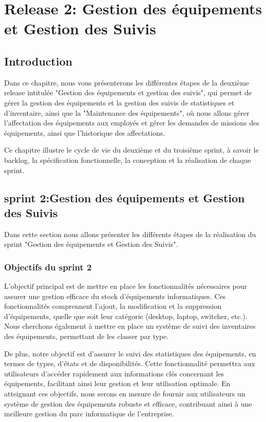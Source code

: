 ﻿\chapter{Release 2: Gestion des équipements et Gestion des Suivis}





\section*{Introduction}
Dans ce chapitre, nous vous présenterons les différentes étapes de la deuxième release intitulée "Gestion des équipements et gestion des suivis", qui permet de gérer la gestion des équipements et la gestion des suivis de statistiques et d'inventaire, ainsi que la "Maintenance des équipements", où nous allons gérer l'affectation des équipements aux employés et gérer les demandes de missions des équipements, ainsi que l'historique des affectations. 

Ce chapitre illustre le cycle de vie du deuxième et du troisième sprint, à savoir le backlog, la spécification fonctionnelle, la conception et la réalisation de chaque sprint.

\section{sprint 2:Gestion des équipements et Gestion des Suivis} 

Dans cette section nous allons présenter les différents étapes de la réalisation du sprint "Gestion des équipements et Gestion des Suivis".
    \subsection{Objectifs du sprint 2}
 L'objectif principal est de mettre en place les fonctionnalités nécessaires pour assurer une gestion efficace du stock d'équipements informatiques. Ces fonctionnalités comprennent l'ajout, la modification et la suppression d'équipements, quelle que soit leur catégorie (desktop, laptop, switcher, etc.). Nous cherchons également à mettre en place un système de suivi des inventaires des équipements, permettant de les classer par type.
 
 De plus, notre objectif est d'assurer le suivi des statistiques des équipements, en termes de types, d'états et de disponibilités. Cette fonctionnalité permettra aux utilisateurs d'accéder rapidement aux informations clés concernant les équipements, facilitant ainsi leur gestion et leur utilisation optimale. En atteignant ces objectifs, nous serons en mesure de fournir aux utilisateurs un système de gestion des équipements robuste et efficace, contribuant ainsi à une meilleure gestion du parc informatique de l'entreprise.

